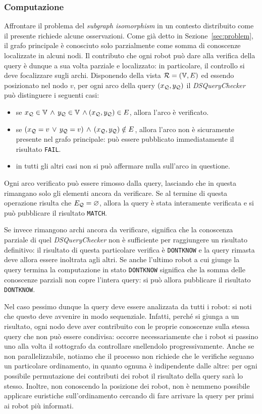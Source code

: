 \subsubsection*{Computazione}
Affrontare il problema del \emph{subgraph isomorphism} in un
contesto distribuito come il presente richiede alcune osservazioni.
Come già detto in Sezione~\ref{sec:problem}, il grafo principale
è conosciuto solo parzialmente come somma di conoscenze localizzate
in alcuni nodi.
Il contributo che ogni robot può dare alla verifica della query
è dunque a sua volta parziale e localizzato: in particolare,
il controllo si deve focalizzare sugli archi.
Disponendo della vista $\mathcal{R} = (\mathbb{V}, E)$ ed essendo posizionato
nel nodo $v$, per ogni arco della query $(x_{\mathcal{Q}}, y_{\mathcal{Q}})$
il \emph{DSQueryChecker} può distinguere i seguenti casi:
\begin{itemize}
\item se \(x_{\mathcal{Q}} \in \mathbb{V}\,\wedge\,y_{\mathcal{Q}} \in \mathbb{V}\,
  \wedge (x_{\mathcal{Q}}, y_{\mathcal{Q}}) \in E\), allora l'arco è verificato.
\item se \((x_{\mathcal{Q}} = v\,\vee\,y_{\mathcal{Q}} = v)\,
  \wedge\,(x_{\mathcal{Q}}, y_{\mathcal{Q}}) \notin E\),
  allora l'arco non è sicuramente presente nel grafo principale:
  può essere pubblicato immediatamente il risultato \texttt{FAIL}.
\item in tutti gli altri casi non si può affermare nulla
  sull'arco in questione.
\end{itemize}
%
Ogni arco verificato può essere rimosso dalla query, lasciando
che in questa rimangano solo gli elementi ancora da verificare.
Se al termine di questa operazione risulta che $E_{\mathcal{Q}} = \varnothing$,
allora la query è stata interamente verificata e si può
pubblicare il risultato \texttt{MATCH}.

Se invece rimangono archi ancora da verificare, significa che
la conoscenza parziale di quel \emph{DSQueryChecker} non è
sufficiente per raggiungere un risultato definitivo:
il risultato di questa particolare verifica è \texttt{DONTKNOW}
e la query rimasta deve allora essere inoltrata agli altri.
Se anche l'ultimo robot a cui giunge la query termina la
computazione in stato \texttt{DONTKNOW} significa che la somma
delle conoscenze parziali non copre l'intera query: si può
allora pubblicare il risultato \texttt{DONTKNOW}.

Nel caso pessimo dunque la query deve essere analizzata da tutti
i robot: si noti che questo deve avvenire in modo sequenziale.
Infatti, perché si giunga a un risultato, ogni nodo deve aver
contribuito con le proprie conoscenze sulla stessa query che
non può essere condivisa: occorre necessariamente che i robot
si passino uno alla volta il sottografo da controllare
snellendolo progressivamente. Anche se non parallelizzabile,
notiamo che il processo non richiede che le verifiche seguano
un particolare ordinamento, in quanto ognuna è indipendente
dalle altre: per ogni possibile permutazione dei contributi dei
robot il risultato della query sarà lo stesso.
Inoltre, non conoscendo la posizione dei robot, non è nemmeno
possibile applicare euristiche sull'ordinamento cercando
di fare arrivare la query per primi ai robot più informati.

